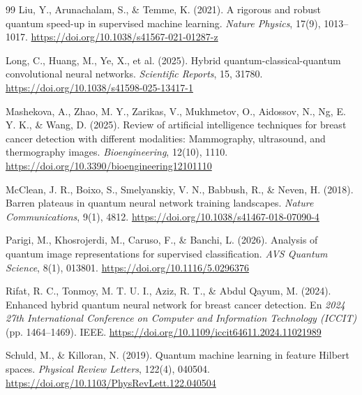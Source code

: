 \begin{thebibliography}{99}
    Liu, Y., Arunachalam, S., \& Temme, K. (2021).
    A rigorous and robust quantum speed-up in supervised machine learning.
    \textit{Nature Physics}, 17(9), 1013--1017.
    \url{https://doi.org/10.1038/s41567-021-01287-z}

    Long, C., Huang, M., Ye, X., et al. (2025). Hybrid quantum-classical-quantum convolutional neural networks.
    \textit{Scientific Reports}, 15, 31780.
    \url{https://doi.org/10.1038/s41598-025-13417-1}


    Mashekova, A., Zhao, M. Y., Zarikas, V., Mukhmetov, O., Aidossov, N., Ng, E. Y. K., \& Wang, D. (2025).
    Review of artificial intelligence techniques for breast cancer detection with different modalities:
    Mammography, ultrasound, and thermography images. \textit{Bioengineering}, 12(10), 1110.
    \url{https://doi.org/10.3390/bioengineering12101110}


    McClean, J. R., Boixo, S., Smelyanskiy, V. N., Babbush, R., \& Neven, H. (2018).
    Barren plateaus in quantum neural network training landscapes.
    \textit{Nature Communications}, 9(1), 4812.
    \url{https://doi.org/10.1038/s41467-018-07090-4}

    Parigi, M., Khosrojerdi, M., Caruso, F., \& Banchi, L. (2026).
    Analysis of quantum image representations for supervised classification.
    \textit{AVS Quantum Science}, 8(1), 013801.
    \url{https://doi.org/10.1116/5.0296376}

    Rifat, R. C., Tonmoy, M. T. U. I., Aziz, R. T., \& Abdul Qayum, M. (2024).
    Enhanced hybrid quantum neural network for breast cancer detection.
    En \textit{2024 27th International Conference on Computer and Information Technology (ICCIT)} (pp. 1464--1469). IEEE.
    \url{https://doi.org/10.1109/iccit64611.2024.11021989}

    Schuld, M., \& Killoran, N. (2019). Quantum machine learning in feature {H}ilbert spaces.
    \textit{Physical Review Letters}, 122(4), 040504.
    \url{https://doi.org/10.1103/PhysRevLett.122.040504}



\end{thebibliography}
